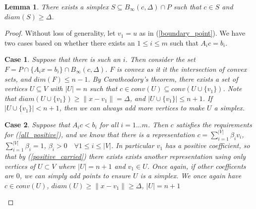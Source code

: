 \documentclass{article}
\newtheorem{lemma}[theorem]{Lemma}
\theoremstyle{case}
\newtheorem{case}{Case}
\let\oldref\ref
\renewcommand{\ref}[1]{(\oldref{#1})}
\begin{document}
\begin{lemma}
\label{there_is_a_big_simplex}
There exists a simplex $S \subseteq B_{\infty}(c, \Delta) \cap P$ such that $c \in S$ and $diam(S) \ge \Delta$.
\end{lemma}
\begin{proof}
Without loss of generality, let $v_1 = u$ as in \ref{boundary_point}.
We have two cases based on whether there exists an $1\le i \le m$ such that $A_i c = b_i$.

\begin{case}
Suppose that there is such an $i$.
Then consider the set $F = P \cap \{A_i x = b_i\} \cap B_{\infty}(c, \Delta)$.
$F$ is convex as it it the intersection of convex sets, and $dim(F) \le n - 1$.
By Caratheodory's theorem, there exists a set of vertices $U \subseteq V$ with $|U| = n$ such that $c \in conv(U) \subseteq conv(U \cup \{v_1\})$.
Note that $diam(U\cup \{v_1\}) \ge \|x-v_1\| = \Delta$, and $|U\cup \{v_1\}| \le n+1$.
If $|U\cup \{v_1\}| < n+1$, then we can always add more vertices to make $U$ a simplex.
\end{case}
\begin{case}
Suppose that $A_i c < b_i$ for all $i=1\ldots m$.
Then $c$ satisfies the requirements for \ref{all_positive}, and we know that there is a representation 
$c = \sum_{i=1}^{|V|} \beta_i v_i$, $\sum_{i=1}^{|V|} \beta_i =1$,
$\beta_i > 0 \quad \forall 1\le i \le |V|$.
In particular $v_1$ has a positive coefficient, so that by \ref{positive_carried} there exists exists another representation using only vertices of $U\subset V$ where $|U| = n+1$ and $v_1 \in U$.
Once again, if other coefficents are $0$, we can simply add points to ensure $U$ is a simplex.
We once again have $c \in conv(U)$, $diam(U) \ge \|x-v_1\| \ge \Delta$, $|U| = n+1$
\end{case}
\end{proof}
\end{document}

